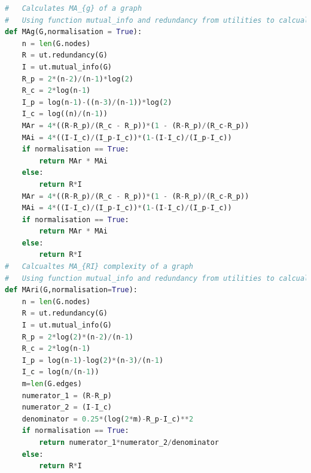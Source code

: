 \documentclass[12pt]{article}
\begin{document}
\begin{lstlisting}[language=Python,breaklines=true]
#   Calculates MA_{g} of a graph
#   Using function mutual_info and redundancy from utilities to calcualte I and R
def MAg(G,normalisation = True):
    n = len(G.nodes)
    R = ut.redundancy(G)
    I = ut.mutual_info(G)
    R_p = 2*(n-2)/(n-1)*log(2)
    R_c = 2*log(n-1)
    I_p = log(n-1)-((n-3)/(n-1))*log(2)
    I_c = log((n)/(n-1))
    MAr = 4*((R-R_p)/(R_c - R_p))*(1 - (R-R_p)/(R_c-R_p))
    MAi = 4*((I-I_c)/(I_p-I_c))*(1-(I-I_c)/(I_p-I_c))
    if normalisation == True:
        return MAr * MAi
    else:
        return R*I
    MAr = 4*((R-R_p)/(R_c - R_p))*(1 - (R-R_p)/(R_c-R_p))
    MAi = 4*((I-I_c)/(I_p-I_c))*(1-(I-I_c)/(I_p-I_c))
    if normalisation == True:
        return MAr * MAi
    else:
        return R*I
#   Calcualtes MA_{RI} complexity of a graph
#   Using function mutual_info and redundancy from utilities to calcualte I and R
def MAri(G,normalisation=True):
    n = len(G.nodes)
    R = ut.redundancy(G)
    I = ut.mutual_info(G)
    R_p = 2*log(2)*(n-2)/(n-1)
    R_c = 2*log(n-1)
    I_p = log(n-1)-log(2)*(n-3)/(n-1)
    I_c = log(n/(n-1))
    m=len(G.edges)
    numerator_1 = (R-R_p)
    numerator_2 = (I-I_c)
    denominator = 0.25*(log(2*m)-R_p-I_c)**2
    if normalisation == True:
        return numerator_1*numerator_2/denominator
    else:
        return R*I
\end{lstlisting}
\end{document}
